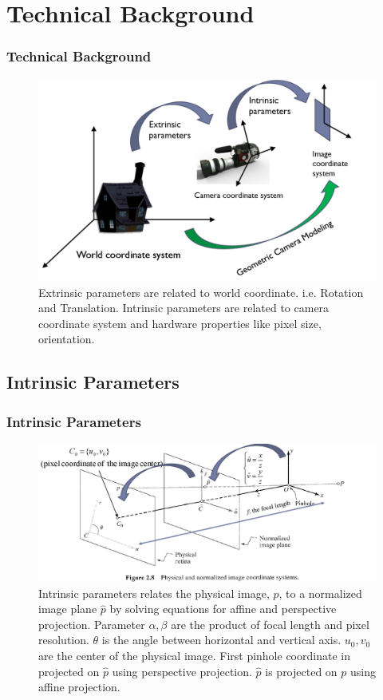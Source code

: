 \documentclass[11pt]{beamer}
\begin{document}
\section{Technical Background}
\begin{frame}
\frametitle{Technical Background}
\begin{figure}
\includegraphics[width=\textwidth]{basics-1.png}
\caption{Extrinsic parameters are related to world coordinate. i.e. Rotation and Translation. Intrinsic parameters are related to camera coordinate system and hardware properties like pixel size, orientation.}
\end{figure}
\end{frame}

\subsection{Intrinsic Parameters}

\begin{frame}
\frametitle{Intrinsic Parameters}
\begin{figure}
\includegraphics[width=.8\textwidth]{physic-normalized-img-coord.png}
\caption{Intrinsic parameters relates the physical image, $p$, to a normalized image plane $\hat{p}$ by solving equations for affine and perspective projection. Parameter $\alpha, \beta$ are the product of focal length and pixel resolution. $\theta$ is the angle between horizontal and vertical axis. $u_0, v_0$ are the center of the physical image. First pinhole coordinate in projected on $\hat{p}$ using perspective projection. $\hat{p}$ is projected on $p$ using affine projection.}
\end{figure}
\end{frame}
\end{document}
